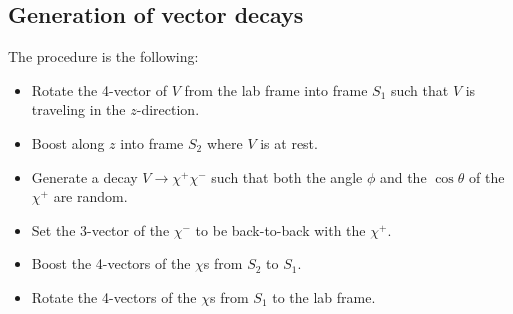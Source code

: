 \documentclass[12pt]{article}
\begin{document}
\subsection{Generation of vector decays}

The procedure is the following:

\begin{itemize}
  \item Rotate the 4-vector of $V$ from the lab frame into frame
    $S_1$ such that $V$ is traveling in the $z$-direction.
  \item  Boost along $z$ into frame $S_2$ where $V$ is at rest.
  \item Generate a decay $V \to \chi^+ \chi^-$ such that
    both the angle $\phi$ and the $\cos \theta$ of the $\chi^+$ are random.
  \item   Set the 3-vector of the $\chi^-$ to be back-to-back with the $\chi^+$.
  \item Boost the 4-vectors of the $\chi$s from $S_2$ to $S_1$.
\item Rotate the 4-vectors of the $\chi$s from $S_1$ to the lab frame.
\end{itemize}
\end{document}
